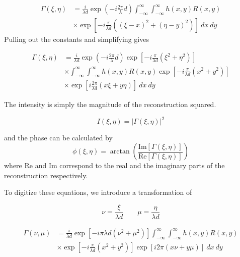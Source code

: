    \begin{equation}
        \begin{aligned}
        \Gamma(\xi,\eta) &= \frac{i}{\lambda d} \exp\left( -i\frac{2\pi}{\lambda}d \right)
        \int_{-\infty}^{\infty}\int_{-\infty}^{\infty}h(x,y)R(x,y) \\
        & \times \exp\left[ -i\frac{\pi}{\lambda d}\left(
        (\xi-x)^{2}+(\eta-y)^{2} \right) \right]~dx~dy
        \end{aligned}
    \end{equation}
Pulling out the constants and simplifying gives

    \begin{equation}
        \begin{aligned}
        \Gamma(\xi,\eta) &= \frac{i}{\lambda d} \exp\left( -i\frac{2\pi}{\lambda}d \right)
        \exp\left[ -i\frac{\pi}{\lambda d}(\xi^2+\eta^2) \right] \\
        &\times \int_{-\infty}^{\infty}\int_{-\infty}^{\infty}h(x,y)R(x,y)
        \exp\left[ -i\frac{\pi}{\lambda d}\left(
        x^{2}+y^{2} \right) \right] \\
        & \times \exp\left[ i\frac{2\pi}{\lambda d}\left(
        x\xi+y\eta \right) \right]~dx~dy
        \end{aligned}
    \end{equation}

    The intensity is simply the magnitude of the reconstruction squared.

    \begin{equation}
        I(\xi,\eta) = |\Gamma(\xi,\eta)|^{2}
    \end{equation}

    and the phase can be calculated by
    \begin{equation}
        \phi(\xi,\eta)=\arctan\left( \frac{\mathrm{Im}[\Gamma(\xi,\eta)]}{\mathrm{Re}[\Gamma(\xi,\eta)]} \right)
    \end{equation}
    where Re and Im correspond to the real and the imaginary parts of the
    reconstruction respectively.

    To digitize these equations, we introduce a transformation of

    \begin{equation}
        \nu = \frac{\xi}{\lambda d} \qquad \mu = \frac{\eta}{\lambda d}
        \label{eq:original}
    \end{equation}

    \begin{equation}
        \begin{aligned}
        \Gamma(\nu,\mu) &= \frac{i}{\lambda d}
        \exp\left[ -i\pi\lambda d(\nu^2+\mu^2) \right] 
        \int_{-\infty}^{\infty}\int_{-\infty}^{\infty}h(x,y)R(x,y) \\
        &\times \exp\left[ -i\frac{\pi}{\lambda d}\left(
        x^{2}+y^{2} \right) \right]
        \exp\left[ i2\pi\left(
        x\nu+y\mu \right) \right]~dx~dy
        \end{aligned}
    \end{equation}


